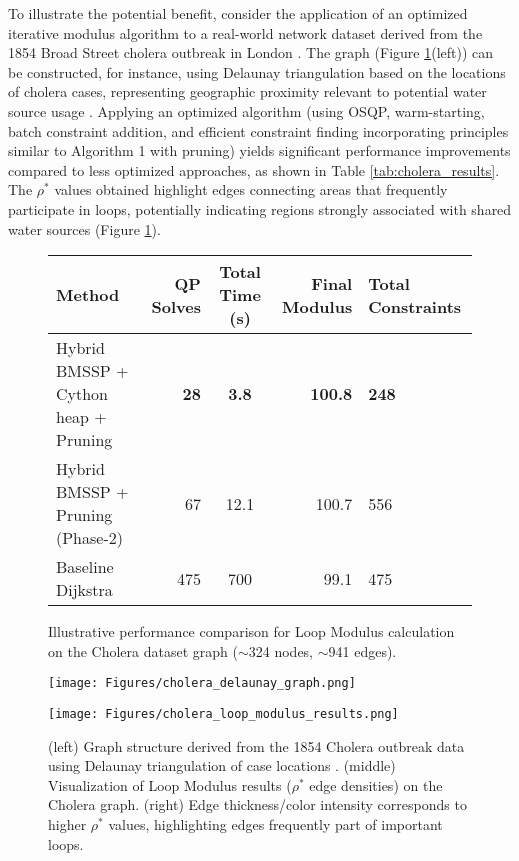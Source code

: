 \documentclass{article}
\begin{document}
To illustrate the potential benefit, consider the application of an optimized iterative modulus algorithm to a real-world network dataset derived from the 1854 Broad Street cholera outbreak in London \cite{snow1856mode}. The graph (Figure \ref{fig:cholera_results_viz}(left)) can be constructed, for instance, using Delaunay triangulation based on the locations of cholera cases, representing geographic proximity relevant to potential water source usage \cite{networkx_delaunay}.
Applying an optimized algorithm (using OSQP, warm-starting, batch constraint addition, and efficient constraint finding incorporating principles similar to Algorithm 1 with pruning) yields significant performance improvements compared to less optimized approaches, as shown in Table \ref{tab:cholera_results}. The $\rho^*$ values obtained highlight edges connecting areas that frequently participate in loops, potentially indicating regions strongly associated with shared water sources (Figure \ref{fig:cholera_results_viz}).

\begin{figure}[ht]
 \centering
 \begin{tabular}{|l | r | c | r | l |}
 \hline
 \textbf{Method} & \textbf{QP Solves} & \textbf{Total Time (s)} & \textbf{Final Modulus} & \textbf{Total Constraints}  \\ \hline 
 Hybrid BMSSP + Cython heap + Pruning & \textbf{28} & \textbf{3.8} & \textbf{100.8} & \textbf{248} \\ \hline
 Hybrid BMSSP + Pruning (Phase-2) & 67 & 12.1 & 100.7 & 556 \\ \hline
 Baseline Dijkstra & 475 & 700 & 99.1 & 475 \\ \hline
 \end{tabular}
 \caption{Illustrative performance comparison for Loop Modulus calculation on the Cholera dataset graph ($\sim$324 nodes, $\sim$941 edges).}
 \label{tab:cholera_results}
 \vspace{1em} %
 \centering
    \begin{minipage}[c]{0.25\textwidth}
        \centering
        \texttt{[image: Figures/cholera\_delaunay\_graph.png]}
    \end{minipage}%
    \hfill
    \begin{minipage}[c]{0.75\textwidth}
        \centering
        \texttt{[image: Figures/cholera\_loop\_modulus\_results.png]}
    \end{minipage}
 \caption{(left) Graph structure derived from the 1854 Cholera outbreak data using Delaunay triangulation of case locations \cite{networkx_delaunay}. (middle) Visualization of Loop Modulus results ($\rho^*$ edge densities) on the Cholera graph. (right) Edge thickness/color intensity corresponds to higher $\rho^*$ values, highlighting edges frequently part of important loops.}
 \label{fig:cholera_results_viz}
\end{figure}
\end{document}
